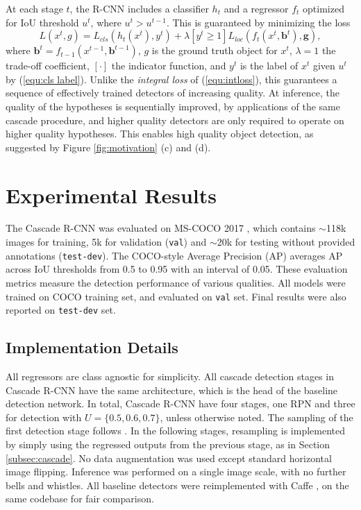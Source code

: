 \documentclass[10pt,twocolumn,letterpaper]{article}
\begin{document}
At each stage $t$, the R-CNN includes a classifier $h_t$ and a
regressor $f_t$ optimized for IoU threshold $u^t$, where $u^t>u^{t-1}$.
This is guaranteed by minimizing the loss
\begin{equation}
  L(x^t,g)=L_{cls}(h_t(x^t),y^t)+\lambda[y^t\geq{1}]L_{loc}(f_t(x^t,\textbf{b}^t),\textbf{g}),
\end{equation}
where $\textbf{b}^t=f_{t-1}(x^{t-1},\textbf{b}^{t-1})$, $g$ is the ground
truth object for $x^t$, $\lambda=1$ the trade-off coefficient, $[\cdot]$ the
indicator function, and $y^t$ is the label of $x^t$ given $u^t$
by (\ref{equ:cls label}). Unlike the \textit{integral loss} of
(\ref{equ:intloss}), this guarantees a sequence of effectively trained detectors of increasing quality. At inference, the quality of the hypotheses is sequentially improved, by applications of the same cascade procedure, and higher quality detectors are only required to operate on higher quality hypotheses. This enables high quality object detection, as suggested by Figure \ref{fig:motivation} (c) and (d).


\section{Experimental Results}

The Cascade R-CNN was evaluated on MS-COCO 2017 \cite{DBLP:conf/eccv/LinMBHPRDZ14}, which contains $\sim$118k images for training, 5k for validation (\texttt{val}) and $\sim$20k for testing without provided annotations (\texttt{test-dev}). The COCO-style Average Precision (AP) averages AP across IoU thresholds from 0.5 to 0.95 with an interval of 0.05. These evaluation metrics measure the detection performance of various qualities. All models were trained on COCO training set, and evaluated on \texttt{val} set. Final results were also reported on \texttt{test-dev} set.

\subsection{Implementation Details}

All regressors are class agnostic for simplicity. All cascade detection stages in Cascade R-CNN have the same architecture, which is the head of the baseline detection network. In total, Cascade R-CNN have four stages, one RPN and three for detection with $U=\{0.5,0.6,0.7\}$, unless otherwise noted. The sampling of the first detection stage follows \cite{DBLP:conf/iccv/Girshick15,DBLP:conf/nips/RenHGS15}. In the following stages, resampling is implemented by simply using
the regressed outputs from the previous stage, as in
Section \ref{subsec:cascade}. No data augmentation was used except standard horizontal image flipping. Inference was performed on a single image scale, with no further bells and whistles. All baseline detectors were reimplemented with Caffe \cite{DBLP:conf/mm/JiaSDKLGGD14}, on the same codebase for fair comparison.
\end{document}
